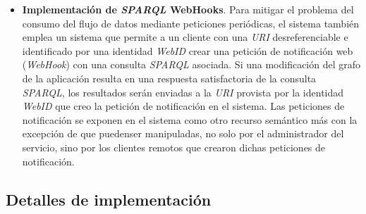 \begin{itemize}
\item \textbf{Implementaci\'on de \textit{SPARQL} WebHooks}. Para mitigar el problema del consumo del flujo de datos mediante peticiones peri\'odicas, el sistema tambi\'en emplea un sistema que permite a un cliente con una \textit{URI} desreferenciable e identificado por una identidad \textit{WebID} crear una petici\'on de notificaci\'on web (\textit{WebHook}) con una consulta \textit{SPARQL} asociada. Si una modificaci\'on del grafo de la aplicaci\'on resulta en una respuesta satisfactoria de la consulta \textit{SPARQL}, los resultados ser\'an enviadas a la \textit{URI} provista por la identidad \textit{WebID} que creo la petici\'on de notificaci\'on en el sistema. Las peticiones de notificaci\'on se exponen en el sistema como otro recurso sem\'antico m\'as con la excepci\'on de que puedenser manipuladas, no solo por el administrador del servicio, sino por los clientes remotos que crearon dichas peticiones de notificaci\'on.
\end{itemize}

\subsection{Detalles de implementaci\'on}

